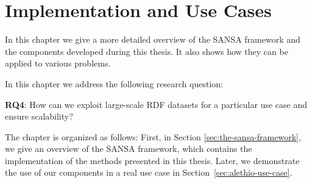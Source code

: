 \chapter{Implementation and Use Cases}
\label{chapter:implementation_and_use_cases}
In this chapter we give a more detailed overview of the SANSA framework and the components developed during this thesis.
It also shows how they can be applied to various problems.

In this chapter we address the following research question:

\begin{tcolorbox}
\textbf{RQ4}: How can we exploit large-scale RDF datasets for a particular use case and ensure scalability?
\end{tcolorbox}

The chapter is organized as follows: First, in Section \ref{sec:the-sansa-framework}, we give an overview of the SANSA framework, which contains the implementation of the methods presented in this thesis.
Later, we demonstrate the use of our components in a real use case in Section~\ref{sec:alethio-use-case}.

